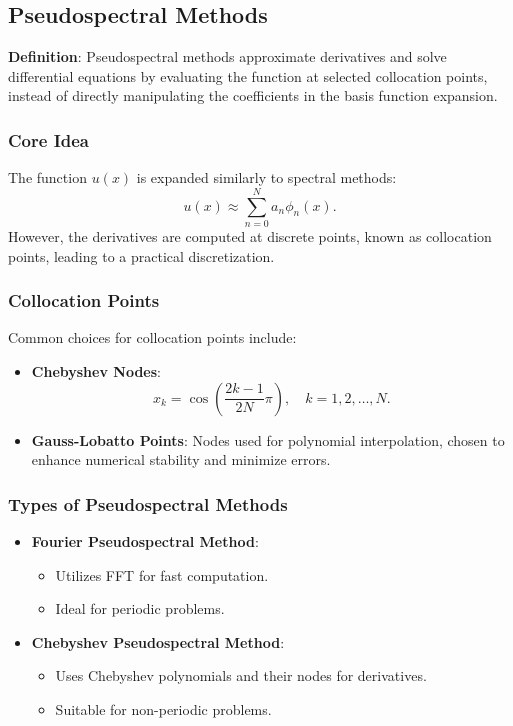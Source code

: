 \documentclass[12pt]{report} %
\begin{document}
\subsection{Pseudospectral Methods}

\textbf{Definition}: Pseudospectral methods approximate derivatives and solve differential equations by evaluating the function at selected collocation points, instead of directly manipulating the coefficients in the basis function expansion.

\subsubsection{Core Idea}
The function \( u(x) \) is expanded similarly to spectral methods:
\[
u(x) \approx \sum_{n=0}^{N} a_n \phi_n(x).
\]
However, the derivatives are computed at discrete points, known as collocation points, leading to a practical discretization.

\subsubsection{Collocation Points}
Common choices for collocation points include:
\begin{itemize}
    \item \textbf{Chebyshev Nodes}:
    \[
    x_k = \cos\left(\frac{2k - 1}{2N} \pi\right), \quad k = 1, 2, \dots, N.
    \]
    \item \textbf{Gauss-Lobatto Points}: Nodes used for polynomial interpolation, chosen to enhance numerical stability and minimize errors.
\end{itemize}

\subsubsection{Types of Pseudospectral Methods}
\begin{itemize}
    \item \textbf{Fourier Pseudospectral Method}:
    \begin{itemize}
        \item Utilizes FFT for fast computation.
        \item Ideal for periodic problems.
    \end{itemize}
    
    \item \textbf{Chebyshev Pseudospectral Method}:
    \begin{itemize}
        \item Uses Chebyshev polynomials and their nodes for derivatives.
        \item Suitable for non-periodic problems.
    \end{itemize}
\end{itemize}
\end{document}
